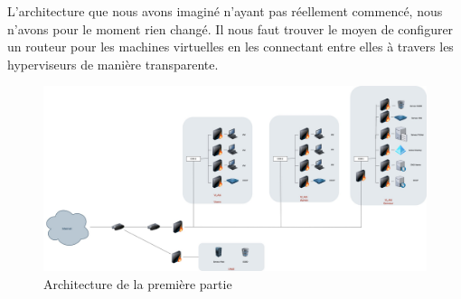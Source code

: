 \documentclass[../file.tex]{subfiles}
\begin{document}
	
L'architecture que nous avons imaginé n'ayant pas réellement commencé, nous n'avons pour le moment 
rien changé. Il nous faut trouver le moyen de configurer un routeur pour les machines virtuelles en les connectant 
entre elles à travers les hyperviseurs de manière transparente.

\begin{figure}[h]
    \centering
    \includegraphics[width=1\textwidth]{../Images/Architecture.jpg}
    \caption{Architecture de la première partie}
    \label{fig:solution1}
\end{figure}
\end{document}

